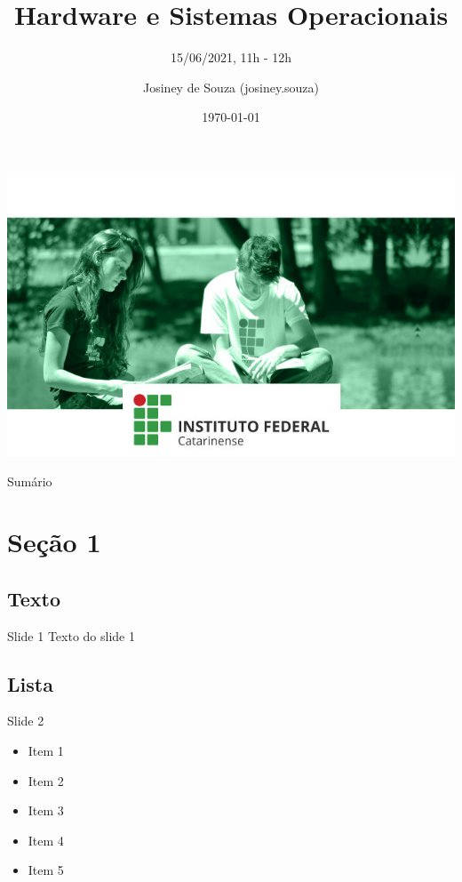 \documentclass[xcolor=dvipsnames,table]{beamer}
\title{Hardware e Sistemas Operacionais}
\subtitle{15/06/2021, 11h - 12h}
\author{Josiney de Souza (josiney.souza)}
\institute{Instituto Federal Catarinense campus Brusque}
\date{\today}
\begin{document}
{
\usebackgroundtemplate%
{%
    \includegraphics[width=\paperwidth,height=\paperheight]{primeira-pag-menor.jpg}%
}
\begin{frame}[plain]{\centerline{\inserttitle}}
\end{frame}
}

\begin{frame}[plain]{}
    \maketitle
\end{frame}

{\small
\begin{frame}[plain]{Sumário}
    \tableofcontents
\end{frame}
}

\section{Seção 1}
\subsection{Texto}
\begin{frame}{Slide 1}
	Texto do slide 1
\end{frame}

\subsection{Lista}
\begin{frame}{Slide 2}
	\begin{itemize}
		\item Item 1
		\item Item 2
		\item Item 3
		\item Item 4
		\item Item 5
	\end{itemize}
\end{frame}
\end{document}
